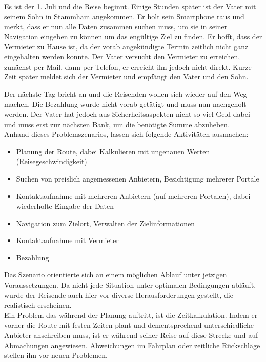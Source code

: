 Es ist der 1. Juli und die Reise beginnt. Einige Stunden später ist der Vater mit seinem Sohn in Stammham angekommen. Er holt sein Smartphone raus und merkt, dass er nun alle Daten zusammen suchen muss, um sie in seiner Navigation eingeben zu können um das engültige Ziel zu finden. Er hofft, dass der Vermieter zu Hause ist, da der vorab angekündigte Termin zeitlich nicht ganz eingehalten werden konnte. Der Vater versucht den Vermieter zu erreichen, zunächst per Mail, dann per Telefon, er erreicht ihn jedoch nicht direkt. Kurze Zeit später meldet sich der Vermieter und empfängt den Vater und den Sohn.

Der nächste Tag bricht an und die Reisenden wollen sich wieder auf den Weg machen. Die Bezahlung wurde nicht vorab getätigt und muss nun nachgeholt werden. Der Vater hat jedoch aus Sicherheitsaspekten nicht so viel Geld dabei und muss erst zur nächsten Bank, um die benötigte Summe abzuheben.\\


Anhand dieses Problemszenarios, lassen sich folgende Aktivitäten ausmachen:
\begin{itemize}
   \item 
   Planung der Route, dabei Kalkulieren mit ungenauen Werten (Reisegeschwindigkeit)
   \item 
   Suchen von preislich angemessenen Anbietern, Besichtigung mehrerer Portale
   \item 
   Kontaktaufnahme mit mehreren Anbietern (auf mehreren Portalen), dabei wiederholte Eingabe der Daten
   \item
   Navigation zum Zielort, Verwalten der Zielinformationen
   \item
   Kontaktaufnahme mit Vermieter
   \item
   Bezahlung

\end{itemize}

Das Szenario orientierte sich an einem möglichen Ablauf unter jetzigen Voraussetzungen. Da nicht jede Situation unter optimalen Bedingungen abläuft, wurde der Reisende auch hier vor diverse Herausforderungen gestellt, die realistisch erscheinen. \\
Ein Problem das während der Planung auftritt, ist die Zeitkalkulation. Indem er vorher die Route mit festen Zeiten plant und dementsprechend unterschiedliche Anbieter anschreiben muss, ist er während seiner Reise auf diese Strecke und auf Abmachungen angewiesen. Abweichungen im Fahrplan oder zeitliche Rückschläge stellen ihn vor neuen Problemen. 

